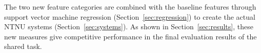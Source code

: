 The two new feature categories are combined with the baseline features
through support vector machine regression (Section~\ref{sec:regression})
to create the actual NTNU systems (Section~\ref{sec:systems}).
As shown in Section~\ref{sec:results}, these new measures give competitive performance 
in the final evaluation results of the shared task.

